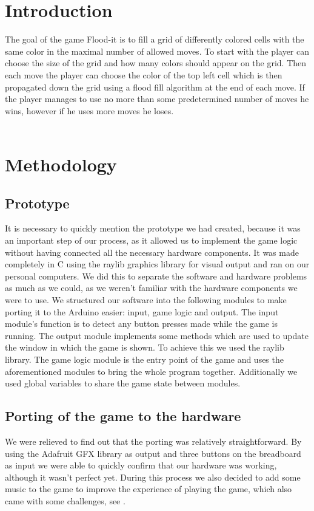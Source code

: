 \documentclass[12pt, a4paper]{article}
\begin{document}
\section*{Introduction}

The goal of the game Flood-it is to fill a grid of differently colored cells with the same color in the maximal number of allowed moves. To start with the player can choose the size of the grid and how many colors should appear on the grid. Then each move the player can choose the color of the top left cell which is then propagated down the grid using a flood fill algorithm at the end of each move. If the player manages to use no more than some predetermined number of moves he wins, however if he uses more moves he loses.\\\\

\pagebreak

\section*{Methodology}

\subsection*{Prototype}

It is necessary to quickly mention the prototype we had created, because it was an important step of our process, as it allowed us to implement the game logic without having connected all the necessary hardware components. It was made completely in C using the raylib graphics library for visual output and ran on our personal computers. We did this to separate the software and hardware problems as much as we could, as we weren't familiar with the hardware components we were to use. We structured our software into the following modules to make porting it to the Arduino easier: input, game logic and output. The input module's function is to detect any button presses made while the game is running. The output module implements some methods which are used to update the window in which the game is shown. To achieve this we used the raylib library. The game logic module is the entry point of the game and uses the aforementioned modules to bring the whole program together. Additionally we used global variables to share the game state between modules.


\subsection*{Porting of the game to the hardware}
We were relieved to find out that the porting was relatively straightforward. By using the Adafruit GFX library as output and three buttons on the breadboard as input we were able to quickly confirm that our hardware was working, although it wasn't perfect yet. During this process we also decided to add some music to the game to improve the experience of playing the game, which also came with some challenges, see .
\end{document}
